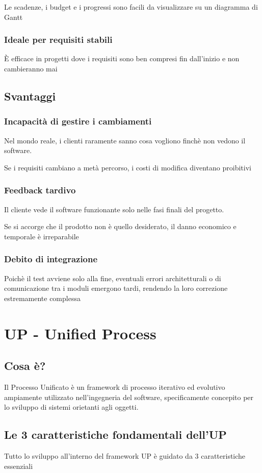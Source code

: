 Le scadenze, i budget e i progressi sono facili da visualizzare su un diagramma di Gantt

\subsection{Ideale per requisiti stabili}
È efficace in progetti dove i requisiti sono ben compresi fin dall'inizio e non cambieranno mai


\section{Svantaggi}
\subsection{Incapacità di gestire i cambiamenti}
Nel mondo reale, i clienti raramente sanno cosa vogliono finchè non vedono il software.

Se i requisiti cambiano a metà percorso, i costi di modifica diventano proibitivi

\subsection{Feedback tardivo}
Il cliente vede il software funzionante solo nelle fasi finali del progetto.

Se si accorge che il prodotto non è quello desiderato, il danno economico e temporale è irreparabile

\subsection{Debito di integrazione}
Poichè il test avviene solo alla fine, eventuali errori architetturali o di comunicazione tra i moduli emergono tardi, rendendo la loro correzione estremamente complessa


\chapter{UP - Unified Process}
\section{Cosa è?}
Il Processo Unificato è un framework di processo iterativo ed evolutivo ampiamente utilizzato nell'ingegneria del software, specificamente concepito per lo sviluppo di sistemi orietanti agli oggetti.

\section{Le 3 caratteristiche fondamentali dell'UP}
Tutto lo sviluppo all'interno del framework UP è guidato da 3 caratteristiche essenziali

